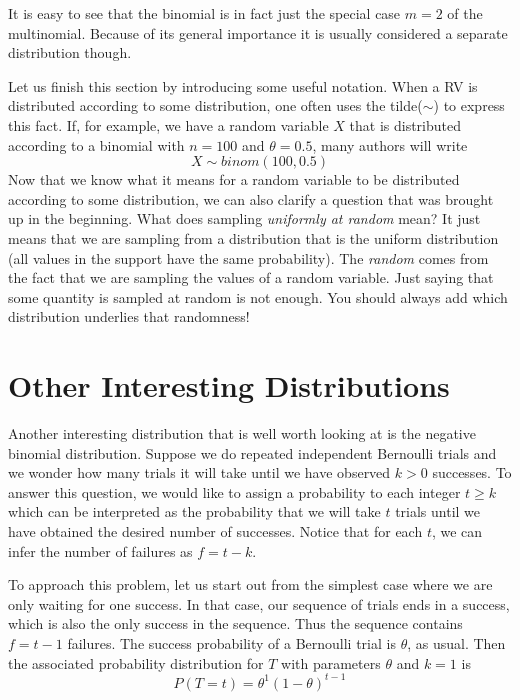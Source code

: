 It is easy to see that the binomial is in fact just the special case
$m=2$ of the multinomial. Because of its general importance it is usually
considered a separate distribution though.

Let us finish this section by introducing some useful notation. When a RV is distributed according to some distribution, one often uses
the tilde($\sim$) to express this fact. If, for example, we have a random variable $ X $ that is distributed according to a binomial with $ n=100 $
and $ \theta = 0.5 $, many authors will write
$$ X \sim binom(100, 0.5) $$
Now that we know what it means for a random variable to be distributed according to some distribution, we can also clarify a question 
that was brought up in the beginning. What does sampling \textit{uniformly at random} mean? It just means that we are sampling from
a distribution that is the uniform distribution (all values in the support have the same probability). The \textit{random} comes from the fact that
we are sampling the values of a random variable. Just saying that some quantity is sampled at random is not enough. You should
always add which distribution underlies that randomness!


\section{Other Interesting Distributions}
Another interesting distribution that is well worth looking at is the negative binomial distribution. Suppose we do repeated independent Bernoulli trials and we wonder
how many trials it will take until we have observed $ k > 0 $ successes. To answer this question, we would like to assign a probability to each integer $ t \geq k $ which 
can be interpreted as the probability that we will take $ t $ trials until we have obtained the desired number of successes. Notice that for each $ t $, we can infer
the number of failures as $ f = t - k $.

To approach this problem, let us start out from the simplest case where we are only waiting for one success. In that case, our sequence of trials ends in a success,
which is also the only success in the sequence. Thus the sequence contains $ f = t-1 $ failures. The success probability of a Bernoulli trial is $ \theta $, as usual.
Then the associated probability distribution for $ T $ with parameters $ \theta $ and $ k=1 $ is
\begin{equation}\label{eq:geometric}
P(T=t) = \theta^{1} (1-\theta)^{t-1}
\end{equation}

